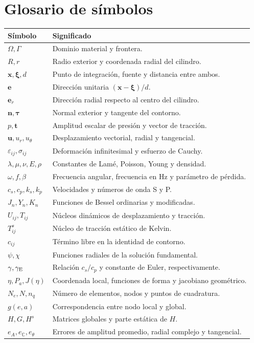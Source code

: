 \documentclass[11pt,a4paper]{report}
\numberwithin{equation}{chapter}
\newcommand{\vect}[1]{\bm{#1}}
\begin{document}
\chapter{Glosario de s\'imbolos}
\begin{longtable}{p{}p{}}
\toprule
S\'imbolo & Significado\\
\midrule
\endhead
$\Omega,\Gamma$ & Dominio material y frontera.\\
$R,r$ & Radio exterior y coordenada radial del cilindro.\\
$\vect x,\vect\xi,d$ & Punto de integraci\'on, fuente y distancia entre ambos.\\
$\vect e$ & Direcci\'on unitaria $(\vect x-\vect\xi)/d$.\\
$\vect e_r$ & Direcci\'on radial respecto al centro del cilindro.\\
$\vect n,\vect\tau$ & Normal exterior y tangente del contorno.\\
$p,\vect t$ & Amplitud escalar de presi\'on y vector de tracci\'on.\\
$\vect u,u_r,u_\theta$ & Desplazamiento vectorial, radial y tangencial.\\
$\varepsilon_{ij},\sigma_{ij}$ & Deformaci\'on infinitesimal y esfuerzo de Cauchy.\\
$\lambda,\mu,\nu,E,\rho$ & Constantes de Lam\'e, Poisson, Young y densidad.\\
$\omega,f,\beta$ & Frecuencia angular, frecuencia en Hz y par\'ametro de p\'erdida.\\
$c_s,c_p,k_s,k_p$ & Velocidades y n\'umeros de onda S y P.\\
$J_n,Y_n,K_n$ & Funciones de Bessel ordinarias y modificadas.\\
$U_{ij},T_{ij}$ & N\'ucleos din\'amicos de desplazamiento y tracci\'on.\\
$T^s_{ij}$ & N\'ucleo de tracci\'on est\'atico de Kelvin.\\
$c_{ij}$ & T\'ermino libre en la identidad de contorno.\\
$\psi,\chi$ & Funciones radiales de la soluci\'on fundamental.\\
$\gamma,\gamma_{\rm E}$ & Relaci\'on $c_s/c_p$ y constante de Euler, respectivamente.\\
$\eta,P_a,J(\eta)$ & Coordenada local, funciones de forma y jacobiano geom\'etrico.\\
$N_e,N,n_q$ & N\'umero de elementos, nodos y puntos de cuadratura.\\
$g(e,a)$ & Correspondencia entre nodo local y global.\\
$H,G,H^s$ & Matrices globales y parte est\'atica de $H$.\\
$e_A,e_{\mathbb C},e_\theta$ & Errores de amplitud promedio, radial complejo y tangencial.\\
\bottomrule
\end{longtable}
\end{document}
